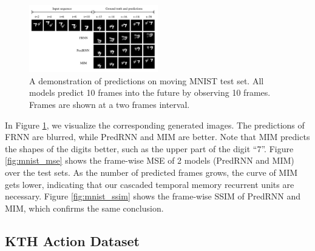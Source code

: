 \documentclass[10pt,twocolumn,letterpaper]{article}
\begin{document}

\begin{figure}[h]
  \centering
  \includegraphics[width=0.5\textwidth]{fig/mnist_predictions.pdf}
  \caption{A demonstration of predictions on moving MNIST test set. All models predict 10 frames into the future by observing 10 frames. Frames are shown at a two frames interval.}
  \label{fig:mnist_results}
\end{figure}

In Figure \ref{fig:mnist_results}, we visualize the corresponding generated images. The predictions of FRNN are blurred, while PredRNN and MIM are better. Note that MIM predicts the shapes of the digits better, such as the upper part of the digit ``7''. Figure \ref{fig:mnist_mse} shows the frame-wise MSE of 2 models (PredRNN and MIM) over the test sets. As the number of predicted frames grows, the curve of MIM gets lower, indicating that our cascaded temporal memory recurrent units are necessary. Figure \ref{fig:mnist_ssim} shows the frame-wise SSIM of PredRNN and MIM, which confirms the same conclusion.


\subsection{KTH Action Dataset}
\end{document}
